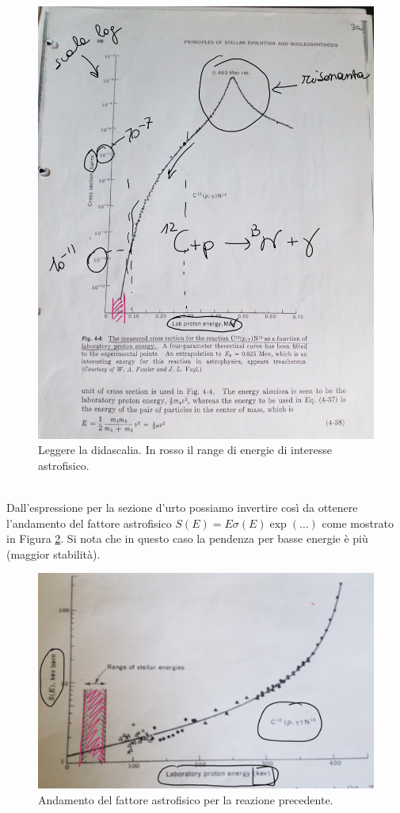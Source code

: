 \begin{figure}[!h]
    \centering
    \includegraphics[scale=0.2]{Immagini/0322_crosssection.png}
    \caption{Leggere la didascalia. In rosso il range di energie di interesse astrofisico.}
    \label{0322_cross}
\end{figure}\\
\noindent Dall'espressione per la sezione d'urto possiamo invertire così da ottenere l'andamento del fattore astrofisico $S(E) = E \sigma(E)\exp(\dots)$ come mostrato in Figura \ref{0322_fatastr}. Si nota che in questo caso la pendenza per basse energie è più  (maggior stabilità).

\begin{figure}[h]
    \centering
    \includegraphics[scale=0.3]{Immagini/0322_fattoreastr.png}
    \caption{Andamento del fattore astrofisico per la reazione precedente.}
    \label{0322_fatastr}
\end{figure}
